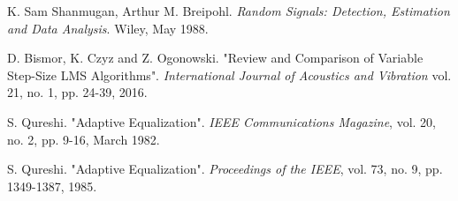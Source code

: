 \documentclass[main.tex]{subfiles}
\begin{document}
\begin{thebibliography}{00}
    K. Sam Shanmugan, Arthur M. Breipohl.
    \textit{Random Signals: Detection, Estimation and Data Analysis}.
    Wiley, May 1988.

    D. Bismor, K. Czyz and Z. Ogonowski. "Review and Comparison of Variable Step-Size LMS Algorithms". 
    \textit{International Journal of Acoustics and Vibration} vol. 21, no. 1, pp. 24-39, 2016.

    S. Qureshi. "Adaptive Equalization".
    \textit{IEEE Communications Magazine}, vol. 20, no. 2, pp. 9-16, March 1982.

    S. Qureshi. "Adaptive Equalization".
    \textit{Proceedings of the IEEE}, vol. 73, no. 9, pp. 1349-1387, 1985.
    
\end{thebibliography}
\end{document}
